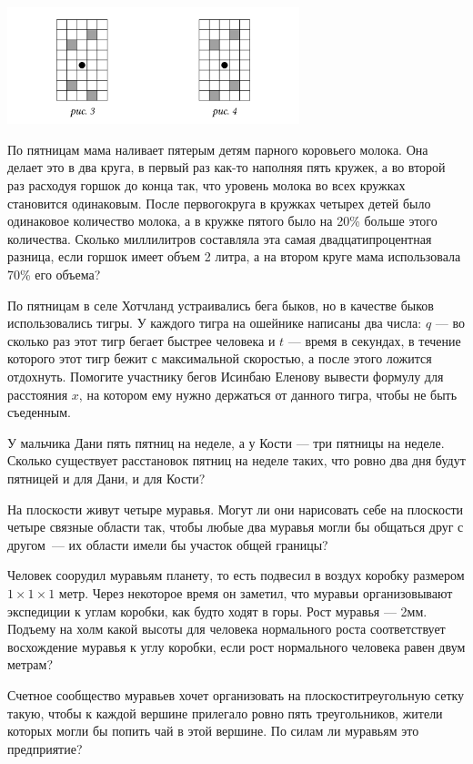 \begin{center}
  \includegraphics[width=8.5cm]{stats/2016/Figures/Corbleud.png}
\end{center}

\begin{itemize}
\itA По пятницам мама наливает пятерым детям парного коровьего молока. Она делает это в два круга, в первый раз как-то наполняя пять кружек, а во второй раз расходуя горшок до конца так, что уровень молока во всех кружках становится одинаковым. После первого\linebreak круга в кружках четырех детей было одинаковое количество молока, а в кружке пятого было на 20\% больше этого количества. Сколько миллилитров составляла эта самая двадцатипроцентная разница, если горшок имеет объем 2 литра, а на втором круге мама использовала 70\% его объема?

\itB По пятницам в селе Хотчланд устраивались бега быков, но в качестве быков использовались тигры. У каждого тигра на ошейнике написаны два числа: $q$ — во сколько раз этот тигр бегает быстрее человека и $t$ — время в секундах, в течение которого этот тигр бежит с максимальной скоростью, а после этого ложится отдохнуть. Помогите участнику бегов Исинбаю Еленову вывести формулу для расстояния $x$, на котором ему нужно держаться от данного тигра, чтобы не быть съеденным.

\itC У мальчика Дани пять пятниц на неделе, а у Кости — три пятницы на неделе. Сколько существует расстановок пятниц на неделе таких, что ровно два дня будут пятницей и для Дани, и для Кости?
\end{itemize}

\begin{itemize}
\itA На плоскости живут четыре муравья. Могут ли они нарисовать себе на плоскости четыре связные области так, чтобы любые два муравья могли бы общаться друг с другом~— их области имели бы участок общей границы?

\itB Человек соорудил муравьям планету, то есть подвесил в воздух коробку размером $1 \times 1 \times 1$ метр. Через некоторое время он заметил, что муравьи организовывают экспедиции к углам коробки, как будто ходят в горы. Рост муравья — 2мм. Подъему на холм какой высоты для человека нормального роста соответствует восхождение муравья к углу коробки, если рост нормального человека равен двум метрам?

\itC Счетное сообщество муравьев хочет организовать на плоскости\linebreak треугольную сетку такую, чтобы к каждой вершине прилегало ровно пять треугольников, жители которых могли бы попить чай в этой вершине. По силам ли муравьям это предприятие?
\end{itemize}

